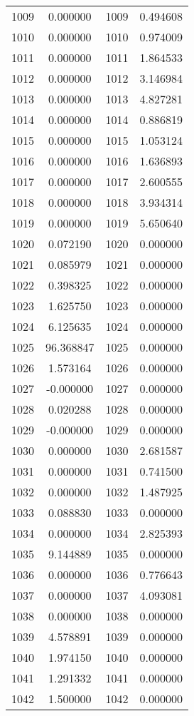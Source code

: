 \documentclass[12pt]{article}
\begin{document}
\begin{longtable}{@{}cccc@{}}
1009 & 0.000000 & 1009 & 0.494608 \\
1010 & 0.000000 & 1010 & 0.974009 \\
1011 & 0.000000 & 1011 & 1.864533 \\
1012 & 0.000000 & 1012 & 3.146984 \\
1013 & 0.000000 & 1013 & 4.827281 \\
1014 & 0.000000 & 1014 & 0.886819 \\
1015 & 0.000000 & 1015 & 1.053124 \\
1016 & 0.000000 & 1016 & 1.636893 \\
1017 & 0.000000 & 1017 & 2.600555 \\
1018 & 0.000000 & 1018 & 3.934314 \\
1019 & 0.000000 & 1019 & 5.650640 \\
1020 & 0.072190 & 1020 & 0.000000 \\
1021 & 0.085979 & 1021 & 0.000000 \\
1022 & 0.398325 & 1022 & 0.000000 \\
1023 & 1.625750 & 1023 & 0.000000 \\
1024 & 6.125635 & 1024 & 0.000000 \\
1025 & 96.368847 & 1025 & 0.000000 \\
1026 & 1.573164 & 1026 & 0.000000 \\
1027 & -0.000000 & 1027 & 0.000000 \\
1028 & 0.020288 & 1028 & 0.000000 \\
1029 & -0.000000 & 1029 & 0.000000 \\
1030 & 0.000000 & 1030 & 2.681587 \\
1031 & 0.000000 & 1031 & 0.741500 \\
1032 & 0.000000 & 1032 & 1.487925 \\
1033 & 0.088830 & 1033 & 0.000000 \\
1034 & 0.000000 & 1034 & 2.825393 \\
1035 & 9.144889 & 1035 & 0.000000 \\
1036 & 0.000000 & 1036 & 0.776643 \\
1037 & 0.000000 & 1037 & 4.093081 \\
1038 & 0.000000 & 1038 & 0.000000 \\
1039 & 4.578891 & 1039 & 0.000000 \\
1040 & 1.974150 & 1040 & 0.000000 \\
1041 & 1.291332 & 1041 & 0.000000 \\
1042 & 1.500000 & 1042 & 0.000000 \\

\end{longtable}
\end{document}
